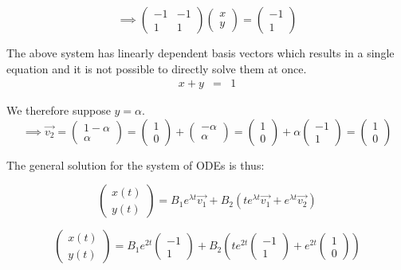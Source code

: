 \documentclass[12pt,a4paper]{article}
\begin{document}
\begin{enumerate}
  \[ 
  \implies   \begin{pmatrix} -1 & -1 \\ 1 & 1 \end{pmatrix} 
    \begin{pmatrix} x \\ y \end{pmatrix}
    =\begin{pmatrix} -1 \\ 1 \end{pmatrix}
  \]


  The above system has linearly dependent basis vectors which results in a single equation and it is not possible to directly solve them at once.
  \begin{eqnarray*}
  x + y &=& 1
  \end{eqnarray*}

We therefore suppose $y=\alpha $.
   \[ 
   \implies  \vec{v_2} =\begin{pmatrix} 1-\alpha \\ \alpha \end{pmatrix}
    =\begin{pmatrix} 1 \\ 0 \end{pmatrix} + \begin{pmatrix} -\alpha \\ \alpha \end{pmatrix} 
    =\begin{pmatrix} 1 \\ 0 \end{pmatrix} + \alpha \begin{pmatrix} -1 \\ 1 \end{pmatrix} 
    =\begin{pmatrix} 1 \\ 0 \end{pmatrix}
  \]

 The general solution for the system of ODEs is thus:

  \[ 
    \begin{pmatrix} x(t)\\ y(t) \end{pmatrix}
    =B_1e^{\lambda t}\vec{v_1} + B_2\left( te^{\lambda t}\vec{v_1} + e^{\lambda t}\vec{v_2} \right)    
  \]

  \[ 
    \begin{pmatrix} x(t)\\ y(t) \end{pmatrix}
    =B_1e^{2 t}\begin{pmatrix} -1 \\ 1 \end{pmatrix}  + B_2\left( te^{2t}\begin{pmatrix} -1 \\ 1 \end{pmatrix}  + e^{2 t}\begin{pmatrix} 1 \\ 0 \end{pmatrix}  \right)    
  \]


\end{enumerate}
\end{document}
